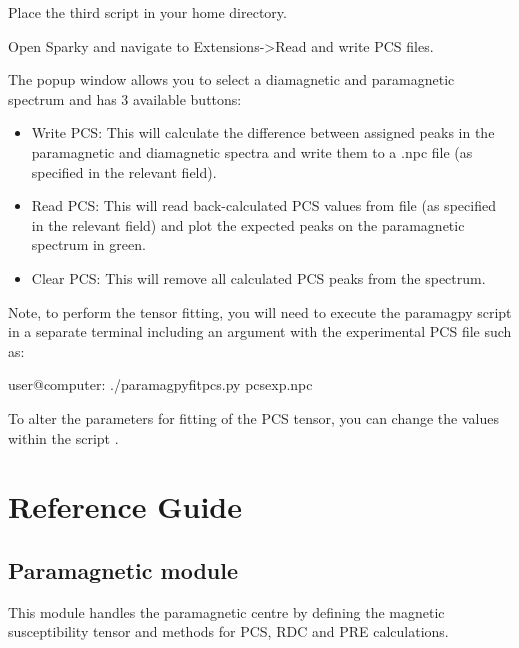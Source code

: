 \documentclass[a4paper,10pt,english,openany,oneside]{sphinxmanual}
\begin{document}
Place the third script  in your home directory.

Open Sparky and navigate to Extensions-\textgreater{}Read and write PCS files.

\noindent{}

The popup window allows you to select a diamagnetic and paramagnetic spectrum and has 3 available buttons:
\begin{itemize}
\item {} 
Write PCS: This will calculate the difference between assigned peaks in the paramagnetic and diamagnetic spectra and write them to a .npc file (as specified in the relevant field).

\item {} 
Read PCS: This will read back-calculated PCS values from file (as specified in the relevant field) and plot the expected peaks on the paramagnetic spectrum in green.

\item {} 
Clear PCS: This will remove all calculated PCS peaks from the spectrum.

\end{itemize}

Note, to perform the tensor fitting, you will need to execute the paramagpy script in a separate terminal including an argument with the experimental PCS file such as:

%
\begin{sphinxVerbatim}[commandchars=\\\{\}]
user@computer:\PYGZti{}\PYGZdl{} ./paramagpy\PYGZus{}fit\PYGZus{}pcs.py pcsexp.npc
\end{sphinxVerbatim}

To alter the parameters for fitting of the PCS tensor, you can change the values within the script .


\section{Reference Guide}
\label{\detokenize{reference/index:reference-guide}}\label{\detokenize{reference/index:reference-index}}\label{\detokenize{reference/index::doc}}

\subsection{Paramagnetic module}
\label{\detokenize{reference/index:paramagnetic-module}}
This module handles the paramagnetic centre by defining the magnetic susceptibility
tensor and methods for PCS, RDC and PRE calculations.
\end{document}
